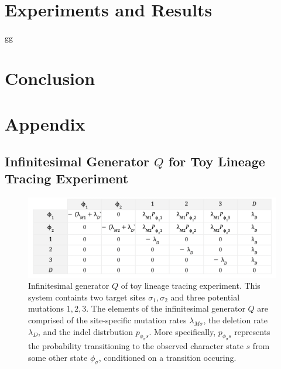 \documentclass{article}
\begin{document}
\section{Experiments and Results}


gg


\section{Conclusion}



\section*{Appendix}

\subsection*{Infinitesimal Generator $Q$ for Toy Lineage Tracing Experiment}
\begin{figure}[h]
  \label{fig:Q}
  \includegraphics[width=\linewidth]{images/Q.png}
  \caption{Infinitesimal generator $Q$ of toy lineage tracing experiment.  This system containts two target sites $\sigma_1, \sigma_2$ and three potential mutations $1,2,3$. The elements of the infinitesimal generator $Q$ are comprised of the site-specific mutation rates $\lambda_{M \sigma}$, the deletion rate $\lambda_D$, and the indel distrbution $p_{\phi_\sigma s}$. More specifically, $p_{\phi_\sigma s}$ represents the probability transitioning to the observed character state $s$ from some other state $\phi_\sigma$, conditioned on a transition occuring.}
\end{figure}
\end{document}
